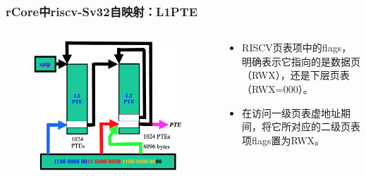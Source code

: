 \begin{frame}
    \frametitle{rCore中riscv-Sv32自映射：L1PTE}

    \begin{columns}
    \begin{column}{0.6\textwidth}
        \begin{figure}
        \includegraphics[width=0.85\linewidth]{lecture07/figs/RV-L1-self-mapping.png}
        \end{figure}
    \end{column} \pause
    \begin{column}{0.4\textwidth}
        \begin{itemize}
            \item RISCV页表项中的flags，明确表示它指向的是数据页（RWX），还是下层页表（RWX=000）。
            \item 在访问一级页表虚地址期间，将它所对应的二级页表项flags置为RWX。
        \end{itemize}
    \end{column}
    \end{columns}

\end{frame}
% 
% 
% 
